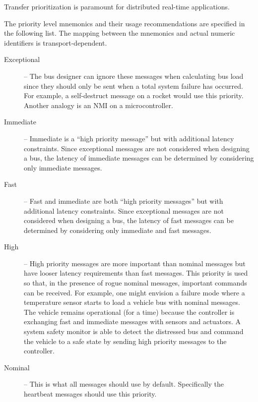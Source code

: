 \begin{remark}[breakable]
    Transfer prioritization is paramount for distributed real-time applications.

    The priority level mnemonics and their usage recommendations are specified in the following list.
    The mapping between the mnemonics and actual numeric identifiers is transport-dependent.

    \begin{description}
        \item[Exceptional] -- The bus designer can ignore these messages when calculating bus load since they
        should only be sent when a total system failure has occurred.
        For example, a self-destruct message on a rocket would use this priority.
        Another analogy is an NMI on a microcontroller.

        \item[Immediate] -- Immediate is a ``high priority message'' but with additional latency constraints.
        Since exceptional messages are not considered when designing a bus, the latency of immediate messages
        can be determined by considering only immediate messages.

        \item[Fast] -- Fast and immediate are both ``high priority messages'' but with additional latency constraints.
        Since exceptional messages are not considered when designing a bus,
        the latency of fast messages can be determined by considering only immediate and fast messages.

        \item[High] -- High priority messages are more important than nominal messages but have looser
        latency requirements than fast messages. This priority is used so that,
        in the presence of rogue nominal messages, important commands can be received.
        For example, one might envision a failure mode where a temperature sensor starts to
        load a vehicle bus with nominal messages.
        The vehicle remains operational (for a time) because the controller is exchanging fast and
        immediate messages with sensors and actuators.
        A system safety monitor is able to detect the distressed bus and command the vehicle to a
        safe state by sending high priority messages to the controller.

        \item[Nominal] -- This is what all messages should use by default.
        Specifically the heartbeat messages should use this priority.


\end{description}
\end{remark}
